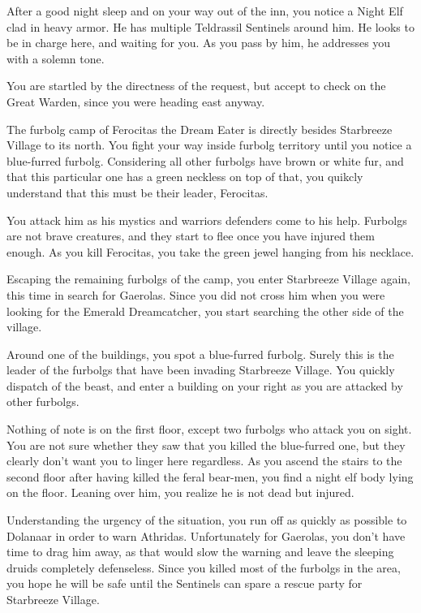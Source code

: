 After a good night sleep and on your way out of the inn, you notice a Night Elf clad in heavy armor. He has multiple Teldrassil Sentinels around him. He looks to be in charge here, and waiting for you. As you pass by him, he addresses you with a solemn tone.


You are startled by the directness of the request, but accept to check on the Great Warden, since you were heading east anyway.

The furbolg camp of Ferocitas the Dream Eater is directly besides Starbreeze Village to its north. You fight your way inside furbolg territory until you notice a blue-furred furbolg. Considering all other furbolgs have brown or white fur, and that this particular one has a green neckless on top of that, you quikcly understand that this must be their leader, Ferocitas.

You attack him as his mystics and warriors defenders come to his help. Furbolgs are not brave creatures, and they start to flee once you have injured them enough. As you kill Ferocitas, you take the green jewel hanging from his necklace.

Escaping the remaining furbolgs of the camp, you enter Starbreeze Village again, this time in search for Gaerolas. Since you did not cross him when you were looking for the Emerald Dreamcatcher, you start searching the other side of the village.

Around one of the buildings, you spot a blue-furred furbolg. Surely this is the leader of the furbolgs that have been invading Starbreeze Village. You quickly dispatch of the beast, and enter a building on your right as you are attacked by other furbolgs. %

Nothing of note is on the first floor, except two furbolgs who attack you on sight. You are not sure whether they saw that you killed the blue-furred one, but they clearly don't want you to linger here regardless. As you ascend the stairs to the second floor after having killed the feral bear-men, you find a night elf body lying on the floor. Leaning over him, you realize he is not dead but injured.



Understanding the urgency of the situation, you run off as quickly as possible to Dolanaar in order to warn Athridas. Unfortunately for Gaerolas, you don't have time to drag him away, as that would slow the warning and leave the sleeping druids completely defenseless. Since you killed most of the furbolgs in the area, you hope he will be safe until the Sentinels can spare a rescue party for Starbreeze Village.

